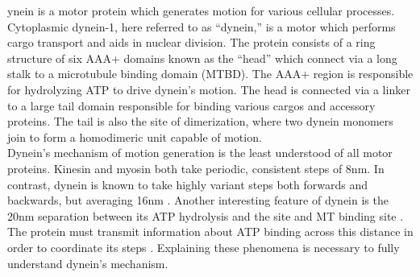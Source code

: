 \documentclass[9pt,twocolumn,twoside]{pnas-new}
\begin{document}



ynein is a motor protein which generates motion for various cellular processes. Cytoplasmic dynein-1, here referred to as ``dynein,'' is a motor which performs cargo transport and aids in nuclear division. The protein consists of a ring structure of six AAA+ domains known as the ``head'' which connect via a long stalk to a microtubule binding domain (MTBD). The AAA+ region is responsible for hydrolyzing ATP to drive dynein's motion. The head is connected via a linker to a large tail domain responsible for binding various cargos and accessory proteins. The tail is also the site of dimerization, where two dynein monomers join to form a homodimeric unit capable of motion.\\

Dynein's mechanism of motion generation is the least understood of all motor proteins. Kinesin and myosin both take periodic, consistent steps of 8nm. In contrast, dynein is known to take highly variant steps both forwards and backwards, but averaging 16nm \cite{yildizpaper, weihongpaper}. Another interesting feature of dynein is the 20nm separation between its ATP hydrolysis and the site and MT binding site \cite{3vkh-cite}. The protein must transmit information about ATP binding across this distance in order to coordinate its steps \cite{mt-atp-coupling}. Explaining these phenomena is necessary to fully understand dynein's mechanism.\\
\end{document}
